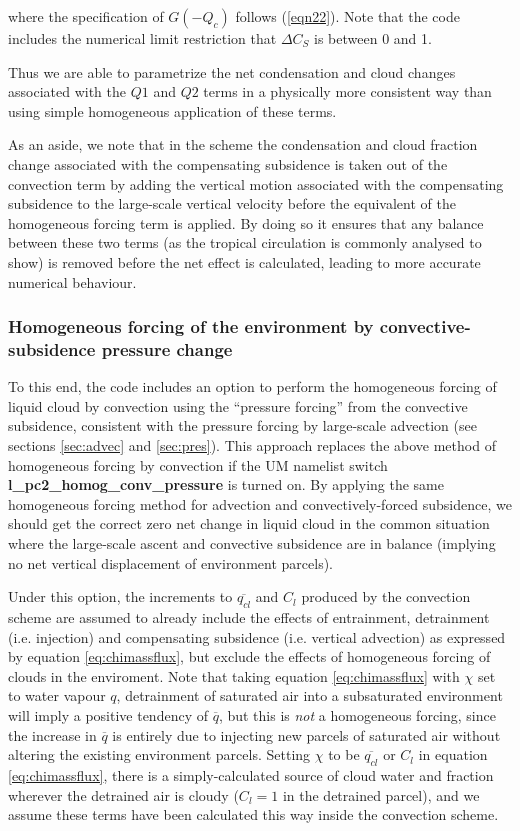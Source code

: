\documentclass{UMDP_article}
\begin{document}
where the specification of $G(-Q_c)$ follows (\ref{eqn22}). Note
that the code includes the numerical limit restriction that
$\Delta C_S$ is between 0 and 1.

Thus we are able to parametrize the net condensation and cloud changes
associated with the $Q1$ and $Q2$ terms in a physically more consistent way than
using simple homogeneous application of these terms.

As an aside, we note that in the \cite{t93} scheme the condensation and cloud
fraction change associated with the compensating subsidence is taken out of
the convection term by adding the vertical motion associated with the compensating
subsidence to the large-scale vertical velocity before the
\cite{t93} equivalent of the homogeneous forcing term is applied. By doing
so it ensures that any balance between these two terms (as the tropical circulation
is commonly analysed to show) is removed before the net effect is calculated,
leading to more accurate numerical behaviour.

\subsubsection{Homogeneous forcing of the environment by
convective-subsidence pressure change}

To this end, the code includes an option to perform the homogeneous forcing
of liquid cloud by convection using the ``pressure forcing'' from the
convective subsidence, consistent with the pressure forcing by large-scale
advection (see sections \ref{sec:advec} and \ref{sec:pres}).
This approach replaces the above method of homogeneous forcing by convection
if the UM namelist switch \textbf{l\_pc2\_homog\_conv\_pressure} is turned on.
By applying the same homogeneous forcing method for advection and
convectively-forced subsidence, we should get the correct zero net
change in liquid cloud in the common situation where the large-scale ascent
and convective subsidence are in balance (implying no net vertical displacement
of environment parcels).

Under this option, the increments to $\overline{q_{cl}}$ and $C_l$ produced
by the convection scheme are assumed to already include the effects
of entrainment, detrainment (i.e. injection) and compensating subsidence
(i.e. vertical advection) as expressed by equation \ref{eq:chimassflux},
but exclude the effects of homogeneous forcing of clouds in the enviroment.
Note that taking equation \ref{eq:chimassflux} with $\chi$ set to
water vapour $q$, detrainment of saturated air into a subsaturated
environment will imply a positive tendency of $\overline{q}$,
but this is \textit{not} a homogeneous forcing, since the increase
in $\overline{q}$ is entirely due to injecting new parcels of saturated
air without altering the existing environment parcels.
Setting $\chi$ to be $\overline{q_{cl}}$ or $C_l$ in equation
\ref{eq:chimassflux}, there is a simply-calculated source of cloud
water and fraction wherever the detrained air is cloudy
($C_l=1$ in the detrained parcel), and we assume
these terms have been calculated this way inside the convection scheme.
\end{document}
